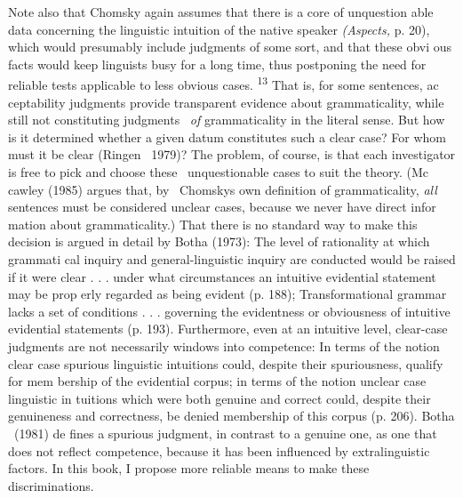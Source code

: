 \clearpage\setcounter{page}{1}\begin{styleStandard}
Note also that Chomsky again assumes that there is a core of {\textquotedbl}unquestion\- able data concerning the linguistic intuition of the native speaker{\textquotedbl} \textit{(Aspects,}\textit{ }p. 20), which would presumably include judgments of some sort, and that these {\textquotedbl}obvi\- ous{\textquotedbl} facts would keep linguists busy for a long time, thus postponing the need for reliable tests applicable to {\textquotedbl}less obvious{\textquotedbl} cases. \textsuperscript{13}\textsuperscript{ }That is, for some sentences, ac\- ceptability judgments provide transparent evidence about grammaticality, while still not constituting judgments \ \textit{of}\textit{ }grammaticality in the literal sense. But how is it determined whether a given datum constitutes such a clear case? For whom must it be clear (Ringen \ 1979)? The problem, of course, is that each investigator is free to pick and choose these \ {\textquotedbl}unquestionable{\textquotedbl} cases to suit the theory. (Mc\- cawley (1985) argues that, by \ Chomsky{\textquotesingle}s own definition of grammaticality, \textit{all}\textit{ }sentences must be considered unclear cases, because we never have direct infor\- mation about grammaticality.) That there is no standard way to make this decision is argued in detail by Botha (1973): {\textquotedbl}The level of rationality at which grammati\- cal inquiry and general-linguistic inquiry are conducted would be raised if it were clear . . . under what circumstances an intuitive evidential statement may be prop\- erly regarded as being evident{\textquotedbl} (p. 188); {\textquotedbl}Transformational grammar lacks a set of conditions . . . governing the evidentness or obviousness of intuitive evidential statements{\textquotedbl} (p. 193). Furthermore, even at an intuitive level, clear-case judgments are not necessarily windows into competence: {\textquotedbl}In terms of the notion {\textquotesingle}clear case{\textquotesingle} spurious linguistic intuitions could, despite their spuriousness, qualify for mem\- bership of the evidential corpus; in terms of the notion {\textquotesingle}unclear case{\textquotesingle} linguistic in\- tuitions which were both genuine and correct could, despite their genuineness and correctness, be denied membership of this corpus{\textquotedbl} (p. 206). Botha \ (1981) de\- fines a spurious judgment, in contrast to a genuine one, as one that does not reflect competence, because it has been influenced by extralinguistic factors. In this book, I propose more reliable means to make these discriminations.
\end{styleStandard}



